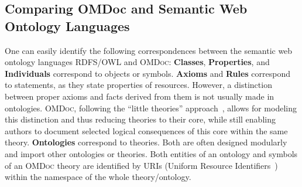 \documentclass{llncs}
\renewcommand{\omdoc}{\textsc{OMDoc}\xspace}
\begin{document}
\ifpublic\else\subsection{Comparing OMDoc and Semantic Web Ontology Languages}\fi
\label{sec:comparing-languages}

One can easily identify the following correspondences between the semantic web ontology
languages RDFS/OWL and \omdoc: \textbf{Classes}, \textbf{Properties}, and
\textbf{Individuals} correspond to objects or symbols. \textbf{Axioms} and \textbf{Rules}
correspond to statements, as they state properties of resources.  However, a distinction
between proper axioms and facts derived from them is not usually made in ontologies.
\omdoc, following the ``little theories'' approach~\cite{FaGu:lt92}, allows for modeling
this distinction and thus reducing theories to their core, while still enabling authors to
document selected logical consequences of this core within the same theory.
\textbf{Ontologies} correspond to theories.  Both are often designed modularly and import
other ontologies or theories.  Both entities of an ontology and symbols of an \omdoc
theory are identified by URIs (Uniform Resource Identifiers~\cite{BerFieMas:05}) within
the namespace of the whole theory/ontology.
\end{document}
